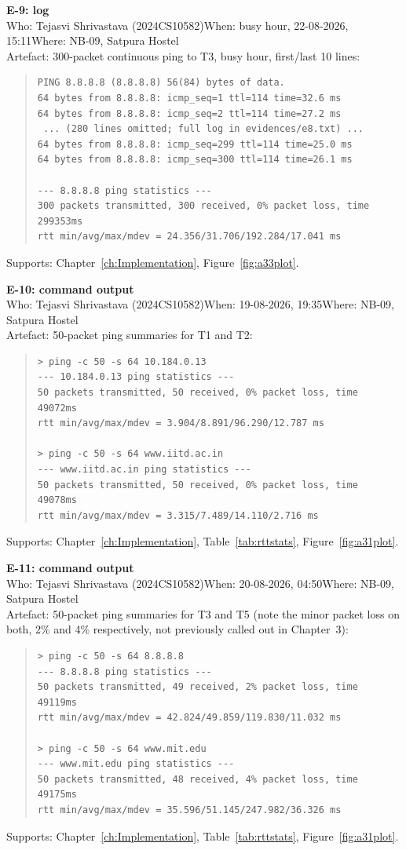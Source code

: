 \textbf{E-9: log}\\
Who: Tejasvi Shrivastava (2024CS10582)\quad When: busy hour, 22-08-2026, 15:11\quad Where: NB-09, Satpura Hostel\\
Artefact: 300-packet continuous ping to T3, busy hour, first/last 10 lines:
\begin{quote}\ttfamily\footnotesize
\begin{verbatim}
PING 8.8.8.8 (8.8.8.8) 56(84) bytes of data.
64 bytes from 8.8.8.8: icmp_seq=1 ttl=114 time=32.6 ms
64 bytes from 8.8.8.8: icmp_seq=2 ttl=114 time=27.2 ms
 ... (280 lines omitted; full log in evidences/e8.txt) ...
64 bytes from 8.8.8.8: icmp_seq=299 ttl=114 time=25.0 ms
64 bytes from 8.8.8.8: icmp_seq=300 ttl=114 time=26.1 ms

--- 8.8.8.8 ping statistics ---
300 packets transmitted, 300 received, 0% packet loss, time 299353ms
rtt min/avg/max/mdev = 24.356/31.706/192.284/17.041 ms
\end{verbatim}
\end{quote}
Supports: Chapter~\ref{ch:Implementation}, Figure~\ref{fig:a33plot}.

\textbf{E-10: command output}\\
Who: Tejasvi Shrivastava (2024CS10582)\quad When: 19-08-2026, 19:35\quad Where: NB-09, Satpura Hostel\\
Artefact: 50-packet ping summaries for T1 and T2:
\begin{quote}\ttfamily\footnotesize
\begin{verbatim}
> ping -c 50 -s 64 10.184.0.13
--- 10.184.0.13 ping statistics ---
50 packets transmitted, 50 received, 0% packet loss, time 49072ms
rtt min/avg/max/mdev = 3.904/8.891/96.290/12.787 ms

> ping -c 50 -s 64 www.iitd.ac.in
--- www.iitd.ac.in ping statistics ---
50 packets transmitted, 50 received, 0% packet loss, time 49078ms
rtt min/avg/max/mdev = 3.315/7.489/14.110/2.716 ms
\end{verbatim}
\end{quote}
Supports: Chapter~\ref{ch:Implementation}, Table~\ref{tab:rttstats}, Figure~\ref{fig:a31plot}.

\textbf{E-11: command output}\\
Who: Tejasvi Shrivastava (2024CS10582)\quad When: 20-08-2026, 04:50\quad Where: NB-09, Satpura Hostel\\
Artefact: 50-packet ping summaries for T3 and T5 (note the minor packet loss on both, 2\% and
4\% respectively, not previously called out in Chapter~3):
\begin{quote}\ttfamily\footnotesize
\begin{verbatim}
> ping -c 50 -s 64 8.8.8.8
--- 8.8.8.8 ping statistics ---
50 packets transmitted, 49 received, 2% packet loss, time 49119ms
rtt min/avg/max/mdev = 42.824/49.859/119.830/11.032 ms

> ping -c 50 -s 64 www.mit.edu
--- www.mit.edu ping statistics ---
50 packets transmitted, 48 received, 4% packet loss, time 49175ms
rtt min/avg/max/mdev = 35.596/51.145/247.982/36.326 ms
\end{verbatim}
\end{quote}
Supports: Chapter~\ref{ch:Implementation}, Table~\ref{tab:rttstats}, Figure~\ref{fig:a31plot}.

